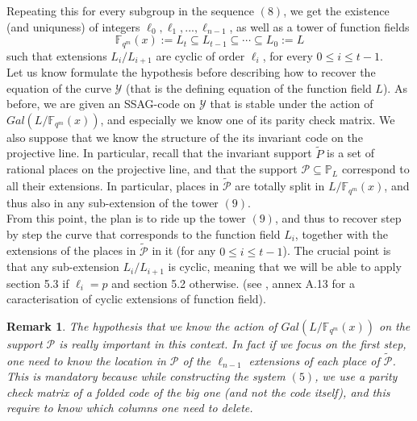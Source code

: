 \documentclass[10pt]{article}
\newtheorem{rq1}{Remark}[]
\newcommand{\s}{\vspace{0.3cm}}
\newcommand{\fqm}{\mathbb{F}_{q^m}}
\newcommand{\su}{\subseteq}
\newcommand{\Y}{\mathcal{Y}}
\newcommand{\PR}{\mathcal{P}}
\begin{document}
\s

Repeating this for every subgroup in the sequence $(8)$, we get the existence (and uniquness) of integers $\ell_0,\ell_1,...,\ell_{n-1}$, as well as a tower of function fields
\begin{equation}
\fqm(x) := L_t \su L_{t-1} \su \cdots \su L_0 := L
\end{equation}
such that extensions $L_i/L_{i+1}$ are cyclic of order $\ell_i$, for every $0 \leq i \leq t-1$. \\

Let us know formulate the hypothesis before describing how to recover the equation of the curve $\Y$ (that is the defining equation of the function field $L$). As before, we are given an SSAG-code on $\Y$ that is stable under the action of $Gal(L/\fqm(x))$, and especially we know one of its parity check matrix. We also suppose that we know the structure of the its invariant code on the projective line. In particular, recall that the invariant support $\tilde{P}$ is a set of rational places on the projective line, and that the support $\PR \su \mathbb{P}_L$ correspond to all their extensions. In particular, places in $\tilde{\PR}$ are  totally split in $L/\fqm(x)$, and thus also in any sub-extension of the tower $(9)$. \\

From this point, the plan is to ride up the tower $(9)$, and thus to recover step by step the curve that corresponds to the function field $L_i$, together with the extensions of the places in $\tilde{\PR}$ in it (for any $0\leq i \leq t-1$). The crucial point is that any sub-extension $L_i/L_{i+1}$ is cyclic, meaning that we will be able to apply section 5.3 if $\ell_i = p$ and section 5.2 otherwise. (see \cite{Sti}, annex A.13 for a caracterisation of cyclic extensions of function field).

\s

\begin{rq1} \rm
The hypothesis that we know the action of $Gal(L/\fqm(x))$ on the support $\PR$ is really important in this context. In fact if we focus on the first step, one need to know the location in $\PR$ of the $\ell_{n-1}$ extensions of each place of $\tilde{\PR}$. This is mandatory because while constructing the system $(5)$, we  use a parity check matrix of a folded code of the big one (and not the code itself), and this require to know which columns one need to delete. 
\end{rq1}

\s
\end{document}
